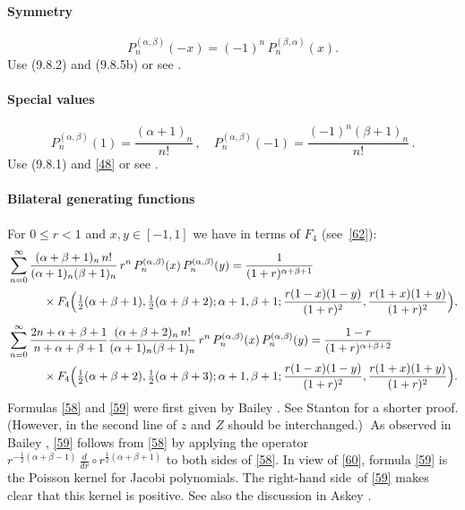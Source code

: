 \documentclass[twoside,11pt]{article}
\newcommand\sa{\smallskipamount}
\newcommand\sLP{\\[\sa]}
\newcommand\al\alpha
\newcommand\be\beta
\newcommand\half{\frac12}
\newcommand\thalf{\tfrac12}
\newcommand\iy\infty
\newcommand\RHS{right-hand side}
\begin{document}
\paragraph{Symmetry}
\begin{equation}
P_n^{(\al,\be)}(-x)=(-1)^n\,P_n^{(\be,\al)}(x).
\label{48}
\end{equation}
Use (9.8.2) and (9.8.5b) or see \cite[Table 18.6.1]{DLMF}.
%
\paragraph{Special values}
\begin{equation}
P_n^{(\al,\be)}(1)=\frac{(\al+1)_n}{n!}\,,\quad
P_n^{(\al,\be)}(-1)=\frac{(-1)^n(\be+1)_n}{n!}\,.
\label{50}
\end{equation}
Use (9.8.1) and \eqref{48} or see \cite[Table 18.6.1]{DLMF}.
%
\paragraph{Bilateral generating functions}
For $0\le r<1$ and $x,y\in[-1,1]$ we have in terms of $F_4$ (see~\eqref{62}):
\begin{align}
&\sum_{n=0}^\iy\frac{(\al+\be+1)_n\,n!}{(\al+1)_n(\be+1)_n}\,r^n\,
P_n^{(\al,\be)}(x)\,P_n^{(\al,\be)}(y)
=\frac1{(1+r)^{\al+\be+1}}
\nonumber\\
&\qquad\quad\times F_4\Big(\thalf(\al+\be+1),\thalf(\al+\be+2);\al+1,\be+1;
\frac{r(1-x)(1-y)}{(1+r)^2},\frac{r(1+x)(1+y)}{(1+r)^2}\Big),
\label{58}\sLP
&\sum_{n=0}^\iy\frac{2n+\al+\be+1}{n+\al+\be+1}
\frac{(\al+\be+2)_n\,n!}{(\al+1)_n(\be+1)_n}\,r^n\,
P_n^{(\al,\be)}(x)\,P_n^{(\al,\be)}(y)
=\frac{1-r}{(1+r)^{\al+\be+2}}\nonumber\\
&\qquad\quad\times F_4\Big(\thalf(\al+\be+2),\thalf(\al+\be+3);\al+1,\be+1;
\frac{r(1-x)(1-y)}{(1+r)^2},\frac{r(1+x)(1+y)}{(1+r)^2}\Big).
\label{59}
\end{align}
Formulas \eqref{58} and \eqref{59} were first
given by Bailey \cite[(2.1), (2.3)]{91}.
See Stanton \cite{485} for a shorter proof. (However, in the second line of
\cite[(1)]{485} $z$ and $Z$ should be interchanged.)$\;$
As observed in Bailey \cite[p.10]{91}, \eqref{59} follows from \eqref{58}
by applying the operator $r^{-\half(\al+\be-1)}\,\frac d{dr}\circ r^{\half(\al+\be+1)}$
to both sides of \eqref{58}.
In view of \eqref{60}, formula \eqref{59} is the Poisson kernel for Jacobi
polynomials. The \RHS\ of \eqref{59} makes clear that this kernel is positive.
See also the discussion in Askey \cite[following (2.32)]{46}.
%
\end{document}
